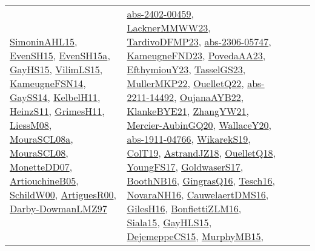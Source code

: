 {\begin{longtable}{lp{3cm}>{\raggedright}p{6cm}>{\raggedright}p{6cm}p{8cm}}
\href{articles/SimoninAHL15.pdf}{SimoninAHL15}\cite{SimoninAHL15}, \href{papers/EvenSH15.pdf}{EvenSH15}\cite{EvenSH15}, \href{articles/EvenSH15a.pdf}{EvenSH15a}\cite{EvenSH15a}, \href{papers/GayHS15.pdf}{GayHS15}\cite{GayHS15}, \href{papers/VilimLS15.pdf}{VilimLS15}\cite{VilimLS15}, \href{articles/KameugneFSN14.pdf}{KameugneFSN14}\cite{KameugneFSN14}, \href{papers/GaySS14.pdf}{GaySS14}\cite{GaySS14}, \href{articles/KelbelH11.pdf}{KelbelH11}\cite{KelbelH11}, \href{papers/HeinzS11.pdf}{HeinzS11}\cite{HeinzS11}, \href{papers/GrimesH11.pdf}{GrimesH11}\cite{GrimesH11}, \href{articles/LiessM08.pdf}{LiessM08}\cite{LiessM08}, \href{papers/MouraSCL08a.pdf}{MouraSCL08a}\cite{MouraSCL08a}, \href{papers/MouraSCL08.pdf}{MouraSCL08}\cite{MouraSCL08}, \href{papers/MonetteDD07.pdf}{MonetteDD07}\cite{MonetteDD07}, \href{papers/ArtiouchineB05.pdf}{ArtiouchineB05}\cite{ArtiouchineB05}, \href{articles/SchildW00.pdf}{SchildW00}\cite{SchildW00}, \href{articles/ArtiguesR00.pdf}{ArtiguesR00}\cite{ArtiguesR00}, \href{articles/Darby-DowmanLMZ97.pdf}{Darby-DowmanLMZ97}\cite{Darby-DowmanLMZ97} & \href{articles/abs-2402-00459.pdf}{abs-2402-00459}\cite{abs-2402-00459}, \href{articles/LacknerMMWW23.pdf}{LacknerMMWW23}\cite{LacknerMMWW23}, \href{papers/TardivoDFMP23.pdf}{TardivoDFMP23}\cite{TardivoDFMP23}, \href{articles/abs-2306-05747.pdf}{abs-2306-05747}\cite{abs-2306-05747}, \href{papers/KameugneFND23.pdf}{KameugneFND23}\cite{KameugneFND23}, \href{papers/PovedaAA23.pdf}{PovedaAA23}\cite{PovedaAA23}, \href{papers/EfthymiouY23.pdf}{EfthymiouY23}\cite{EfthymiouY23}, \href{papers/TasselGS23.pdf}{TasselGS23}\cite{TasselGS23}, \href{articles/MullerMKP22.pdf}{MullerMKP22}\cite{MullerMKP22}, \href{papers/OuelletQ22.pdf}{OuelletQ22}\cite{OuelletQ22}, \href{articles/abs-2211-14492.pdf}{abs-2211-14492}\cite{abs-2211-14492}, \href{papers/OujanaAYB22.pdf}{OujanaAYB22}\cite{OujanaAYB22}, \href{papers/KlankeBYE21.pdf}{KlankeBYE21}\cite{KlankeBYE21}, \href{articles/ZhangYW21.pdf}{ZhangYW21}\cite{ZhangYW21}, \href{papers/Mercier-AubinGQ20.pdf}{Mercier-AubinGQ20}\cite{Mercier-AubinGQ20}, \href{articles/WallaceY20.pdf}{WallaceY20}\cite{WallaceY20}, \href{articles/abs-1911-04766.pdf}{abs-1911-04766}\cite{abs-1911-04766}, \href{articles/WikarekS19.pdf}{WikarekS19}\cite{WikarekS19}, \href{papers/ColT19.pdf}{ColT19}\cite{ColT19}, \href{papers/AstrandJZ18.pdf}{AstrandJZ18}\cite{AstrandJZ18}, \href{papers/OuelletQ18.pdf}{OuelletQ18}\cite{OuelletQ18}, \href{papers/YoungFS17.pdf}{YoungFS17}\cite{YoungFS17}, \href{papers/GoldwaserS17.pdf}{GoldwaserS17}\cite{GoldwaserS17}, \href{papers/BoothNB16.pdf}{BoothNB16}\cite{BoothNB16}, \href{papers/GingrasQ16.pdf}{GingrasQ16}\cite{GingrasQ16}, \href{papers/Tesch16.pdf}{Tesch16}\cite{Tesch16}, \href{articles/NovaraNH16.pdf}{NovaraNH16}\cite{NovaraNH16}, \href{papers/CauwelaertDMS16.pdf}{CauwelaertDMS16}\cite{CauwelaertDMS16}, \href{papers/GilesH16.pdf}{GilesH16}\cite{GilesH16}, \href{papers/BonfiettiZLM16.pdf}{BonfiettiZLM16}\cite{BonfiettiZLM16}, \href{articles/Siala15.pdf}{Siala15}\cite{Siala15}, \href{papers/GayHLS15.pdf}{GayHLS15}\cite{GayHLS15}, \href{papers/DejemeppeCS15.pdf}{DejemeppeCS15}\cite{DejemeppeCS15}, \href{papers/MurphyMB15.pdf}{MurphyMB15}\cite{MurphyMB15}, 
\end{longtable}}
